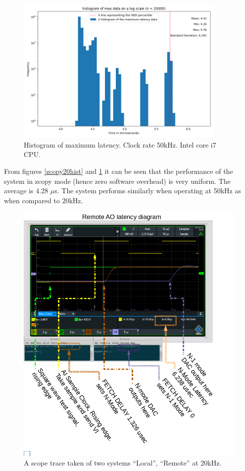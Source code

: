 \documentclass{article}
\begin{document}
\begin{figure}
	\centering
	\includegraphics[width=4.0in]{images/better_images/50kHz_final_small.png}
	\caption{Histogram of maximum latency. Clock rate 50kHz. Intel core i7 CPU.}
	\label{zcopy50hist}
\end{figure}

From figures \ref{zcopy20hist} and \ref{zcopy50hist} it can be seen that the performance of the system in zcopy mode (hence zero software overhead) is very uniform.
The average is 4.28 $\mu$s.
The system performs similarly when operating at 50kHz as when compared to 20kHz. 


\begin{figure}
	\centering
	\includegraphics[width=5.0in]{images/20kHz_annotated_scope.png}
	\caption{A scope trace taken of two systems “Local”, “Remote” at 20kHz.}
	\label{zcopy20scope}
\end{figure}
\end{document}
